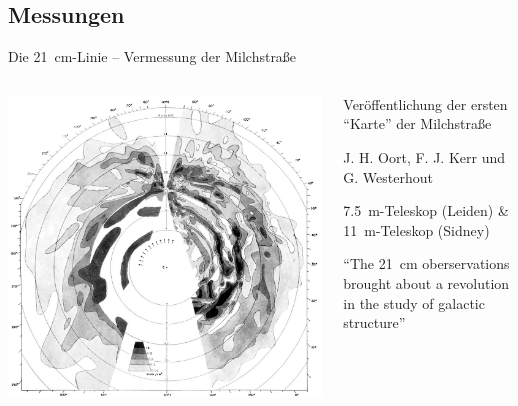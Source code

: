 \subsection{Messungen}
\begin{frame}{Die \SI{21}{\centi\meter}-Linie – Vermessung der Milchstraße}%
  \begin{columns}[c, onlytextwidth]
    \begin{column}{0.47\textwidth}%
      \includegraphics[width=\textwidth, angle=180]{./images/original_map.png}%
    \end{column}%
    \begin{column}{0.47\textwidth}%
      \begin{description}[Messung]
        \item[1958] Veröffentlichung der ersten \enquote{Karte} der Milchstraße
        \item[Autoren] J. H. Oort, F. J. Kerr und G. Westerhout
        \item[Messung] \SI{7.5}{\meter}-Teleskop (Leiden) \&  \SI{11}{\meter}-Teleskop (Sidney)
      \end{description}

      \begin{center}
      \parbox{0.85\linewidth}{\enquote{The \SI{21}{\centi\meter} oberservations brought about a revolution in the study of galactic structure}\cite{oort}} 
      \end{center}
    \end{column}%
  \end{columns}
\end{frame}
